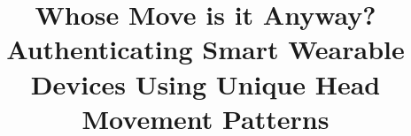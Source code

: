 \documentclass{sigchi}
\newcommand{\superscript}[1]{\ensuremath{^{\textrm{#1}}}}
\def\winlab{\superscript{\dag}}
\def\cmu{\superscript{$\ast$}}
\begin{document}
\title{Whose Move is it Anyway? Authenticating Smart Wearable Devices Using Unique Head Movement Patterns}

\author{
 \\
 \\
 \\
 \\
 \\
}


\begin{comment}
\numberofauthors{1}
\author{
\alignauthor
 Sugang Li\winlab, Ashwin Ashok\cmu, Yanyong Zhang\winlab, Chenren Xu\cmu, Macro Gruteser\winlab, Janne Lindqvist\winlab\\
\vspace{4mm}
        \affaddr{{\winlab}WINLAB, Rutgers University, North Brunswick,NJ, USA}\\
          \vspace{1mm}
        \affaddr{{\cmu}Carnegie Mellon University, Pittsburgh, PA, USA}\\
}
\end{comment}


\maketitle
\newcommand{\systemname}{{\em Headbanger}}










\balance
%


\end{document}
